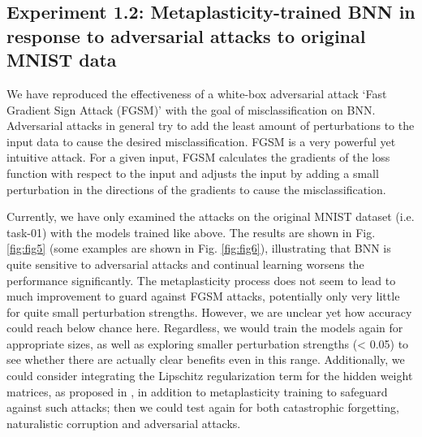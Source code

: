 \documentclass[manuscript,screen,review]{acmart}
\begin{document}
\subsection{Experiment 1.2: Metaplasticity-trained BNN in response to adversarial attacks to original MNIST data}

We have reproduced the effectiveness of a white-box adversarial attack ‘Fast Gradient Sign Attack (FGSM)’ with the goal of misclassification on BNN. Adversarial attacks in general try to add the least amount of perturbations to the input data to cause the desired misclassification. FGSM is a very powerful yet intuitive attack. For a given input, FGSM calculates the gradients of the loss function with respect to the input and adjusts the input by adding a small perturbation in the directions of the gradients to cause the misclassification. 

Currently, we have only examined the attacks on the original MNIST dataset (i.e. task-01) with the models trained like above. The results are shown in Fig. \ref{fig:fig5} (some examples are shown in Fig. \ref{fig:fig6}), illustrating that BNN is quite sensitive to adversarial attacks and continual learning worsens the performance significantly. The metaplasticity process does not seem to lead to much improvement to guard against FGSM attacks, potentially only very little for quite small perturbation strengths. However, we are unclear yet how accuracy could reach below chance here. Regardless, we would train the models again for appropriate sizes, as well as exploring smaller perturbation strengths (< 0.05) to see whether there are actually clear benefits even in this range. Additionally, we could consider integrating the Lipschitz regularization term for the hidden weight matrices, as proposed in \cite{Lin_2019}, in addition to metaplasticity training to safeguard against such attacks; then we could test again for both catastrophic forgetting, naturalistic corruption and adversarial attacks. 
\end{document}
